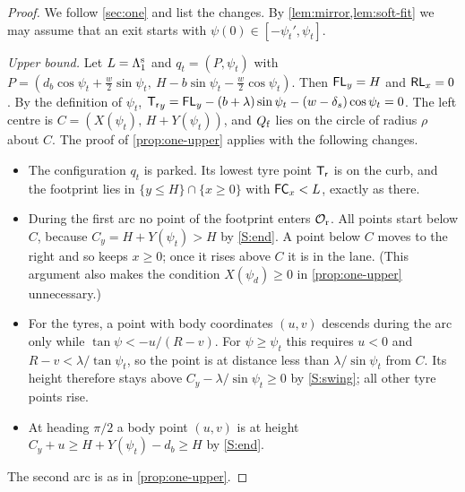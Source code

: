 \begin{proof}
We follow \cref{sec:one} and list the changes.
By \cref{lem:mirror,lem:soft-fit} we may assume that an exit starts with $\psi(0)\in[-\psi_t',\psi_t]$.

\emph{Upper bound.}
Let $L=\Lambda_1^{\rm s}$ and $q_t=(P,\psi_t)$ with $P=(d_b\cos\psi_t+\tfrac w2\sin\psi_t,\ H-b\sin\psi_t-\tfrac w2\cos\psi_t)$.
Then $\mathsf{FL}_y=H$ and $\mathsf{RL}_x=0$.
By the definition of $\psi_t$, $\mathsf{T_r}_y=\mathsf{FL}_y-(b+\lambda)\sin\psi_t-(w-\delta_s)\cos\psi_t=0$.
The left centre is $C=(X(\psi_t),\,H+Y(\psi_t))$, and $Q_{\mathrm f}$ lies on the circle of radius $\rho$ about $C$.
The proof of \cref{prop:one-upper} applies with the following changes.
\begin{itemize}[nosep]
\item The configuration $q_t$ is parked.
Its lowest tyre point $\mathsf{T_r}$ is on the curb, and the footprint lies in $\{y\le H\}\cap\{x\ge0\}$ with $\mathsf{FC}_x<L$, exactly as there.
\item During the first arc no point of the footprint enters $\mathcal{O}_{\mathrm r}$.
All points start below $C$, because $C_y=H+Y(\psi_t)>H$ by \ref{S:end}.
A point below $C$ moves to the right and so keeps $x\ge0$; once it rises above $C$ it is in the lane.
(This argument also makes the condition $X(\psi_d)\ge0$ in \cref{prop:one-upper} unnecessary.)
\item For the tyres, a point with body coordinates $(u,v)$ descends during the arc only while $\tan\psi<-u/(R-v)$.
For $\psi\ge\psi_t$ this requires $u<0$ and $R-v<\lambda/\tan\psi_t$, so the point is at distance less than $\lambda/\sin\psi_t$ from $C$.
Its height therefore stays above $C_y-\lambda/\sin\psi_t\ge0$ by \ref{S:swing}; all other tyre points rise.
\item At heading $\pi/2$ a body point $(u,v)$ is at height $C_y+u\ge H+Y(\psi_t)-d_b\ge H$ by \ref{S:end}.
\end{itemize}
The second arc is as in \cref{prop:one-upper}.


\end{proof}
